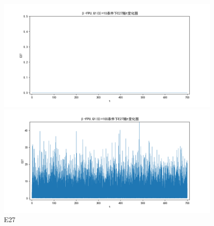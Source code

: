 \documentclass[10pt, a4paper]{article}
\begin{document}
    \begin{figure}[H]
        \begin{minipage}[t]{0.49\textwidth}
            \centering
            \includegraphics[width=\textwidth]{./q6_pics/cmp/E27.png}
        \end{minipage}
        \begin{minipage}[t]{0.49\textwidth}
            \centering
            \includegraphics[width=\textwidth]{./q6_pics/exp/E27.png}
        \end{minipage}
        \caption{E27}\label{fig:E27 in q6}
    \end{figure}
\end{document}
